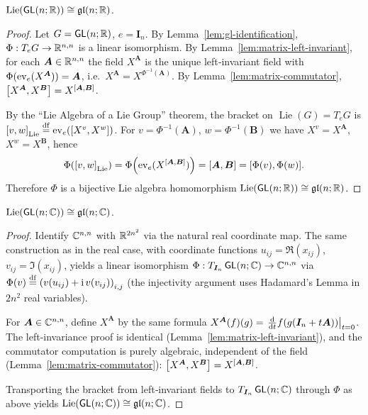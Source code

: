\documentclass[11pt,reqno]{amsart}
\DeclareMathOperator{\Lie}{Lie}
\newcommand{\ii}{\mathrm{i}}
\begin{document}
\begin{Thm}\label{thm:Lie-GLnR}
$\Lie\Br{\GL(n;\R)}\cong\gl(n;\R)$.
\end{Thm}
\begin{proof}
  Let $G=\operatorname{\mathsf{GL}}(n;\mathbb{R})$, $e=\bm I_n$.  By Lemma~\ref{lem:gl-identification},
  $\Phi:T_e G\to\mathbb{R}^{n,n}$ is a linear isomorphism.
  By Lemma~\ref{lem:matrix-left-invariant}, for each $\bm A\in\mathbb{R}^{n,n}$
  the field $X^{\bm A}$ is the unique left‑invariant field with
  $\Phi(\mathrm{ev}_e(X^{\bm A}))=\bm A$, i.e.\ $X^{\bm A}=X^{\Phi^{-1}(\bm A)}$.
  By Lemma~\ref{lem:matrix-commutator},
  $\SqBr{X^{\bm A}, X^{\bm B}} = X^{\SqBr{\bm A,\bm B}}$.

  By the ``Lie Algebra of a Lie Group'' theorem, the bracket on
  $\Lie(G)=T_e G$ is $\SqBr{v,w}_{\Lie}\df\ev_e\Br{\SqBr{X^v,X^w}}$.
  For $v=\Phi^{-1}(\bm A)$, $w=\Phi^{-1}(\bm B)$ we have
  $X^v=X^{\bm A}$, $X^w=X^{\bm B}$, hence
  \[
    \Phi\Br{\SqBr{v,w}_{\Lie}}
    = \Phi\Br{\ev_e(X^{\SqBr{\bm A,\bm B}})}
    = \SqBr{\bm A,\bm B}
    = \SqBr{\Phi(v),\Phi(w)}.
  \]
  Therefore $\Phi$ is a bijective Lie algebra homomorphism
  $\Lie\Br{\GL(n;\R)}\cong\gl(n;\R)$.
\end{proof}

\begin{Thm}\label{thm:Lie-GLnC}
$\Lie\Br{\GL(n;\C)}\cong\gl(n;\C)$.
\end{Thm}
\begin{proof}
  Identify $\mathbb{C}^{n,n}$ with $\mathbb{R}^{2n^2}$ via the natural real coordinate map.
  The same construction as in the real case, with coordinate functions
  $u_{ij}=\Re(x_{ij})$, $v_{ij}=\Im(x_{ij})$, yields a linear isomorphism
  $\Phi:T_{\bm I_n}\operatorname{\mathsf{GL}}(n;\mathbb{C})\to\mathbb{C}^{n,n}$ via
  $\Phi(v)\df\Br{v(u_{ij})+\ii\,v(v_{ij})}_{i,j}$
  (the injectivity argument uses Hadamard's Lemma in $2n^2$ real variables).

  For $\bm A\in\mathbb{C}^{n,n}$, define $X^{\bm A}$ by the same formula
  $X^{\bm A}(f)(g)=\eval{\frac{\dd}{\dd t}f(g(\bm I_n+t\bm A))}_{t=0}$.
  The left‑invariance proof is identical (Lemma~\ref{lem:matrix-left-invariant}),
  and the commutator computation is purely algebraic, independent of the field
  (Lemma~\ref{lem:matrix-commutator}):
  $\SqBr{X^{\bm A},X^{\bm B}}=X^{\SqBr{\bm A,\bm B}}$.

  Transporting the bracket from left‑invariant fields to $T_{\bm I_n}\operatorname{\mathsf{GL}}(n;\mathbb{C})$
  through $\Phi$ as above yields $\Lie\Br{\GL(n;\C)}\cong\gl(n;\C)$.
\end{proof}
\end{document}
